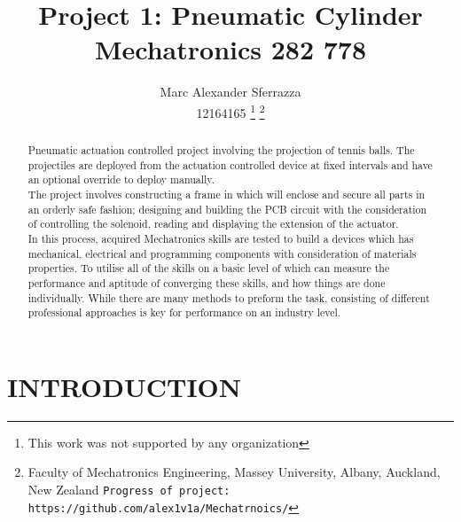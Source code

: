 \documentclass[a4paper, 10pt]{IEEEconf}
\title{\LARGE \bf Project 1: Pneumatic Cylinder\\Mechatronics  282 778}
\author{Marc Alexander Sferrazza \\ 12164165
\thanks{This work was not supported by any organization}
\thanks{Faculty of Mechatronics Engineering, Massey University, Albany, Auckland, New Zealand
        {\tt\small Progress of project: https://github.com/alex1v1a/Mechatrnoics/} } }
\begin{document}
\maketitle


\thispagestyle{empty}
\pagestyle{plain}



\begin{abstract}

Pneumatic actuation controlled project involving the projection of tennis balls. The projectiles are deployed from the actuation controlled device at fixed intervals and have an optional override to deploy manually. 
\\

The project involves constructing a frame in which will enclose and secure all parts in an orderly safe fashion; designing and building the PCB circuit with the consideration of controlling the solenoid, reading and displaying the extension of the actuator.
\\

In this process, acquired Mechatronics skills are tested to build a devices which has mechanical, electrical and programming components with consideration of materials properties. To utilise all of the skills on a basic level of which can measure the performance and aptitude of converging these skills, and how things are done individually. While there are many methods to preform the task, consisting of different professional approaches is key for performance on an industry level.

\end{abstract}


\clearpage
\tableofcontents
\listoffigures
\thispagestyle{empty}
\clearpage
\twocolumn


\setcounter{page}{1}

\section{INTRODUCTION}
\end{document}
